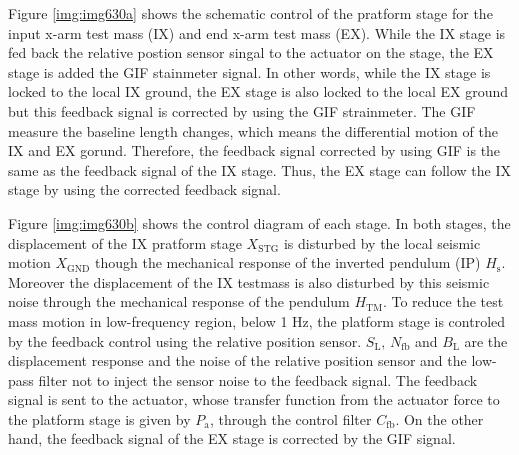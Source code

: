 Figure \ref{img:img630a} shows the schematic control of the pratform stage for the input x-arm test mass (IX) and end x-arm test mass (EX). While the IX stage is fed back the relative postion sensor singal to the actuator on the stage, the EX stage is added the GIF stainmeter signal. In other words, while the IX stage is locked to the local IX ground, the EX stage is also locked to the local EX ground but this feedback signal is corrected by using the GIF strainmeter. The GIF measure the baseline length changes, which means the differential motion of the IX and EX gorund. Therefore, the feedback signal corrected by using GIF is the same as the feedback signal of the IX stage. Thus, the EX stage can follow the IX stage by using the corrected feedback signal.

Figure \ref{img:img630b} shows the control diagram of each stage. In both stages, the displacement of the IX pratform stage $X_{\mathrm{STG}}$ is disturbed by the local seismic motion $X_{\mathrm{GND}}$ though the mechanical response of the inverted pendulum (IP) $H_{\mathrm{s}}$. Moreover the displacement of the IX testmass is also disturbed by this seismic noise through the mechanical response of the pendulum $H_{\mathrm{TM}}$. To reduce the test mass motion in low-frequency region, below 1 Hz, the platform stage is controled by the feedback control using the relative position sensor. $S_{\mathrm{L}},\,N_{\mathrm{fb}}$ and $B_{\mathrm{L}}$ are the displacement response and the noise of the relative position sensor and the low-pass filter not to inject the sensor noise to the feedback signal. The feedback signal is sent to the actuator, whose transfer function from the actuator force to the platform stage is given by $P_{\mathrm{a}}$, through the control filter $C_{\mathrm{fb}}$. On the other hand, the feedback signal of the EX stage is corrected by the GIF signal.

